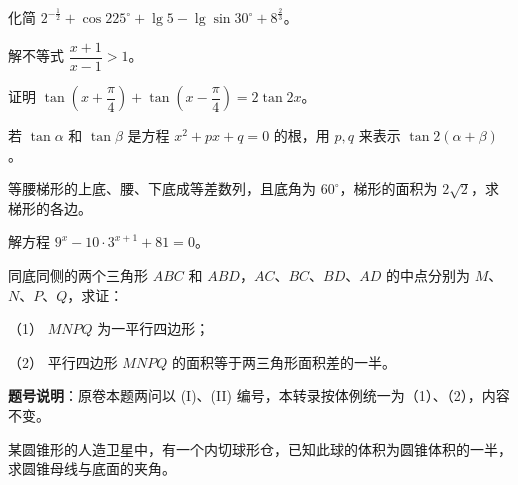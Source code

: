 

\begin{question}
化简 $2^{-\frac12}+\cos 225^\circ+\lg 5-\lg\sin 30^\circ+8^{\frac23}$。

\end{question}
\begin{question}
解不等式 $\dfrac{x+1}{x-1}>1$。

\end{question}
\begin{question}
证明 $\tan\left(x+\dfrac\pi4\right)+\tan\left(x-\dfrac\pi4\right)=2\tan 2x$。

\end{question}
\begin{question}
若 $\tan\alpha$ 和 $\tan\beta$ 是方程 $x^2+px+q=0$ 的根，用 $p,q$ 来表示 $\tan 2(\alpha+\beta)$。

\end{question}
\begin{question}
等腰梯形的上底、腰、下底成等差数列，且底角为 $60^\circ$，梯形的面积为 $2\sqrt2$，求梯形的各边。

\end{question}
\begin{question}
解方程 $9^x-10\cdot 3^{x+1}+81=0$。

\end{question}
\begin{question}
同底同侧的两个三角形 $ABC$ 和 $ABD$，$AC$、$BC$、$BD$、$AD$ 的中点分别为 $M$、$N$、$P$、$Q$，求证：

（1） $MNPQ$ 为一平行四边形；

（2） 平行四边形 $MNPQ$ 的面积等于两三角形面积差的一半。

\begin{gktip}
\textbf{题号说明}：原卷本题两问以 (I)、(II) 编号，本转录按体例统一为（1）、（2），内容不变。
\end{gktip}

\end{question}
\begin{question}
某圆锥形的人造卫星中，有一个内切球形仓，已知此球的体积为圆锥体积的一半，求圆锥母线与底面的夹角。

\end{question}
